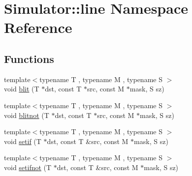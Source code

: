 \hypertarget{namespace_simulator_1_1line}{\section{Simulator\+:\+:line Namespace Reference}
\label{namespace_simulator_1_1line}
}
\subsection*{Functions}
\begin{DoxyCompactItemize}
\item 
{\footnotesize template$<$typename T , typename M , typename S $>$ }\\void \hyperlink{namespace_simulator_1_1line_a238b8d050e9abf8ca7d5a2ab3466e227}{blit} (T $\ast$dst, const T $\ast$src, const M $\ast$mask, S sz)
\item 
{\footnotesize template$<$typename T , typename M , typename S $>$ }\\void \hyperlink{namespace_simulator_1_1line_a97884dd8bbf8be5543c9bd16da4a1797}{blitnot} (T $\ast$dst, const T $\ast$src, const M $\ast$mask, S sz)
\item 
{\footnotesize template$<$typename T , typename M , typename S $>$ }\\void \hyperlink{namespace_simulator_1_1line_ac6d3ef48d601c90b9b5f82029c887b7b}{setif} (T $\ast$dst, const T \&src, const M $\ast$mask, S sz)
\item 
{\footnotesize template$<$typename T , typename M , typename S $>$ }\\void \hyperlink{namespace_simulator_1_1line_a66f7bf7c202ec603fda3c92778b7919b}{setifnot} (T $\ast$dst, const T \&src, const M $\ast$mask, S sz)
\end{DoxyCompactItemize}


